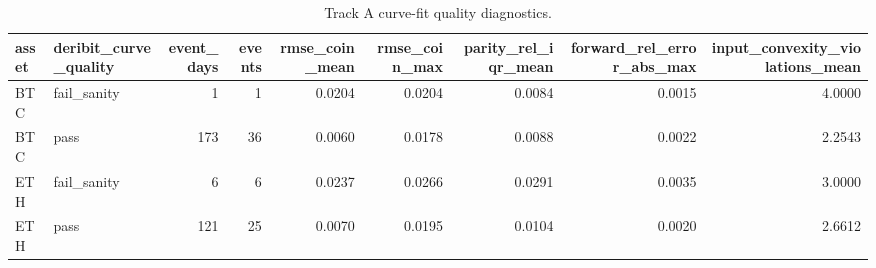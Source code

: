 \begin{table}
\caption{Track A curve-fit quality diagnostics.}
\label{tab:trackA_curve_quality}
\begin{tabular}{llrrrrrrr}
\toprule
asset & deribit\_curve\_quality & event\_days & events & rmse\_coin\_mean & rmse\_coin\_max & parity\_rel\_iqr\_mean & forward\_rel\_error\_abs\_max & input\_convexity\_violations\_mean \\
\midrule
BTC & fail\_sanity & 1 & 1 & 0.0204 & 0.0204 & 0.0084 & 0.0015 & 4.0000 \\
BTC & pass & 173 & 36 & 0.0060 & 0.0178 & 0.0088 & 0.0022 & 2.2543 \\
ETH & fail\_sanity & 6 & 6 & 0.0237 & 0.0266 & 0.0291 & 0.0035 & 3.0000 \\
ETH & pass & 121 & 25 & 0.0070 & 0.0195 & 0.0104 & 0.0020 & 2.6612 \\
\bottomrule
\end{tabular}
\end{table}
